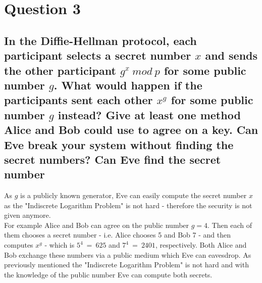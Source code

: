 \documentclass{report}
\begin{document}
	\section{Question 3}
	\startsection
		\renewcommand{\thesubsection}{\thesection.\Alph{subsection}}
		\subsection{In the Diffie-Hellman protocol, each participant selects a secret number $x$ and sends the other participant $g^x \ mod \ p$ for some public number $g$. What would happen if the participants sent each other $x^g$ for some public number $g$ instead? Give at least one method Alice and Bob could use to agree on a key. Can Eve break your system without finding the secret numbers? Can Eve find the secret number}
		\startsubsection
			As $g$ is a publicly known generator, Eve can easily compute the secret number $x$ as the "Indiscrete Logarithm Problem" is not hard - therefore the security is not given anymore. \\
			For example Alice and Bob can agree on the public number $g = 4$. Then each of them chooses a secret number - i.e. Alice chooses 5 and Bob 7 - and then computes $x^g$ - which is $5^4 \ = \ 625$ and $7^4 \ = \ 2401$, respectively. Both Alice and Bob exchange these numbers via a public medium which Eve can eavesdrop. As previously mentioned the "Indiscrete Logarithm Problem" is not hard and with the knowledge of the public number Eve can compute both secrets.
		\closesection
	\closesection
\end{document}
